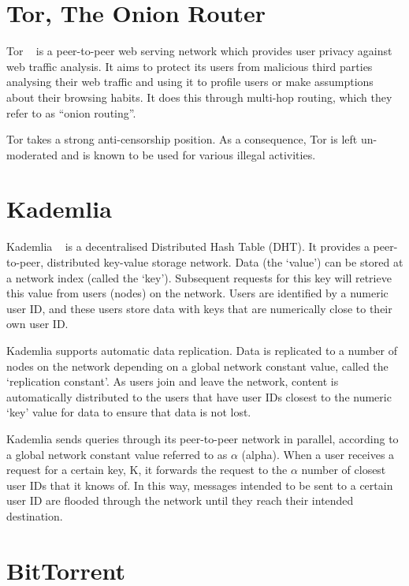 \section{Tor, The Onion Router}

Tor ~\cite{tor} is a peer-to-peer web serving network which provides user privacy against web traffic analysis.
It aims to protect its users from malicious third parties analysing their web traffic and using it to
profile users or make assumptions about their browsing habits. It does this through multi-hop routing,
which they refer to as ``onion routing''.

Tor takes a strong anti-censorship position. As a consequence, Tor is left un-moderated and is known
to be used for various illegal activities.

\section{Kademlia}

Kademlia ~\cite{kademlia} is a decentralised Distributed Hash Table (DHT). It provides a peer-to-peer,
distributed key-value storage network. Data (the `value') can be stored at a network index (called the `key').
Subsequent requests for this key will retrieve this value from users (nodes) on the network.
Users are identified by a numeric user ID, and these users store data with keys that are numerically
close to their own user ID.

Kademlia supports automatic data replication. Data is replicated to a number of nodes on the network depending
on a global network constant value, called the `replication constant'.
As users join and leave the network, content is automatically distributed to the users that have user IDs
closest to the numeric `key' value for data to ensure that data is not lost.

Kademlia sends queries through its peer-to-peer network in parallel, according to a global network constant value
referred to as \(\alpha\) (alpha). When a user receives a request for a certain key, K, it forwards the request to the
\(\alpha\) number of closest user IDs that it knows of. In this way, messages intended to be sent to a certain user ID
are flooded through the network until they reach their intended destination.

\section{BitTorrent}

